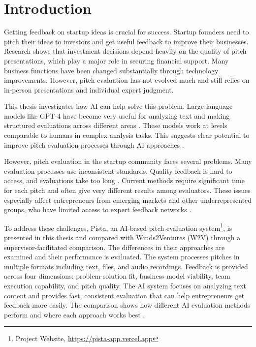 \chapter{Introduction}

\label{ch:introduction}

Getting feedback on startup ideas is crucial for success. Startup founders need to pitch their ideas to investors and get useful feedback to improve their businesses. Research shows that investment decisions depend heavily on the quality of pitch presentations, which play a major role in securing financial support\cite{masterpresentat}. Many business functions have been changed substantially through technology improvements. However, pitch evaluation has not evolved much and still relies on in-person presentations and individual expert judgment.

This thesis investigates how AI can help solve this problem. Large language models like GPT-4 have become very useful for analyzing text and making structured evaluations across different areas \cite{Ozince2024}. These models work at levels comparable to humans in complex analysis tasks. This suggests clear potential to improve pitch evaluation processes through AI approaches \cite{gpt}.

However, pitch evaluation in the startup community faces several problems. Many evaluation processes use inconsistent standards. Quality feedback is hard to access, and evaluations take too long \cite{StartupEvaluati, Kalvapalle2024}. Current methods require significant time for each pitch and often give very different results among evaluators. These issues especially affect entrepreneurs from emerging markets and other underrepresented groups, who have limited access to expert feedback networks \cite{BreakingBarrier}.

To address these challenges, Pista, an AI-based pitch evaluation system\footnote{Project Website, \url{https://pista-app.vercel.app}}, is presented in this thesis and compared with Winds2Ventures (W2V) through a supervisor-facilitated comparison. The differences in their approaches are examined and their performance is evaluated. The system processes pitches in multiple formats including text, files, and audio recordings. Feedback is provided across four dimensions: problem-solution fit, business model viability, team execution capability, and pitch quality. The AI system focuses on analyzing text content and provides fast, consistent evaluation that can help entrepreneurs get feedback more easily. The comparison shows how different AI evaluation methods perform and where each approach works best \cite{TheFutureofAIEv}.

